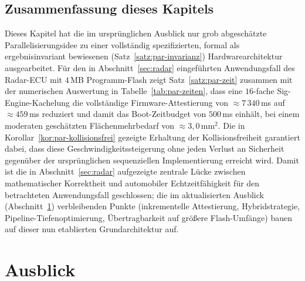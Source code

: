 ﻿\documentclass[a4paper,12pt]{article}
\theoremstyle{definition}
\begin{document}
\subsection{Zusammenfassung dieses Kapitels}

Dieses Kapitel hat die im ursprünglichen Ausblick nur grob abgeschätzte Parallelisierungsidee zu einer vollständig spezifizierten, formal als ergebnisinvariant bewiesenen (Satz~\ref{satz:par-invarianz}) Hardwarearchitektur ausgearbeitet. Für den in Abschnitt~\ref{sec:radar} eingeführten Anwendungsfall des Radar-ECU mit $4$\,MB Programm-Flash zeigt Satz~\ref{satz:par-zeit} zusammen mit der numerischen Auswertung in Tabelle~\ref{tab:par-zeiten}, dass eine $16$-fache Sig-Engine-Kachelung die vollständige Firmware-Attestierung von $\approx 7\,340$\,ms auf $\approx 459$\,ms reduziert und damit das Boot-Zeitbudget von $500$\,ms einhält, bei einem moderaten geschätzten Flächenmehrbedarf von $\approx 3{,}0\,\mathrm{mm}^2$. Die in Korollar~\ref{kor:par-kollisionsfrei} gezeigte Erhaltung der Kollisionsfreiheit garantiert dabei, dass diese Geschwindigkeitssteigerung ohne jeden Verlust an Sicherheit gegenüber der ursprünglichen sequenziellen Implementierung erreicht wird. Damit ist die in Abschnitt~\ref{sec:radar} aufgezeigte zentrale Lücke zwischen mathematischer Korrektheit und automobiler Echtzeitfähigkeit für den betrachteten Anwendungsfall geschlossen; die im aktualisierten Ausblick (Abschnitt~\ref{sec:ausblick}) verbleibenden Punkte (inkrementelle Attestierung, Hybridstrategie, Pipeline-Tiefenoptimierung, Übertragbarkeit auf größere Flash-Umfänge) bauen auf dieser nun etablierten Grundarchitektur auf.

\section{Ausblick}
\label{sec:ausblick}
\end{document}

